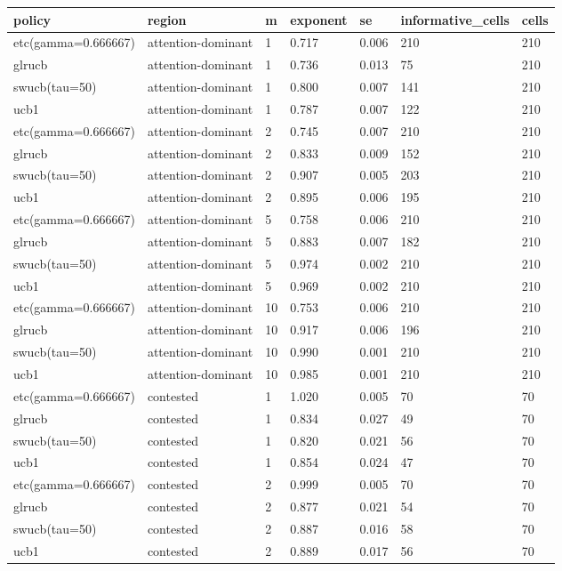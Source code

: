 \begin{tabular}{lllllll}
\toprule
policy & region & m & exponent & se & informative\_cells & cells \\
\midrule
etc(gamma=0.666667) & attention-dominant & 1 & 0.717 & 0.006 & 210 & 210 \\
glrucb & attention-dominant & 1 & 0.736 & 0.013 & 75 & 210 \\
swucb(tau=50) & attention-dominant & 1 & 0.800 & 0.007 & 141 & 210 \\
ucb1 & attention-dominant & 1 & 0.787 & 0.007 & 122 & 210 \\
etc(gamma=0.666667) & attention-dominant & 2 & 0.745 & 0.007 & 210 & 210 \\
glrucb & attention-dominant & 2 & 0.833 & 0.009 & 152 & 210 \\
swucb(tau=50) & attention-dominant & 2 & 0.907 & 0.005 & 203 & 210 \\
ucb1 & attention-dominant & 2 & 0.895 & 0.006 & 195 & 210 \\
etc(gamma=0.666667) & attention-dominant & 5 & 0.758 & 0.006 & 210 & 210 \\
glrucb & attention-dominant & 5 & 0.883 & 0.007 & 182 & 210 \\
swucb(tau=50) & attention-dominant & 5 & 0.974 & 0.002 & 210 & 210 \\
ucb1 & attention-dominant & 5 & 0.969 & 0.002 & 210 & 210 \\
etc(gamma=0.666667) & attention-dominant & 10 & 0.753 & 0.006 & 210 & 210 \\
glrucb & attention-dominant & 10 & 0.917 & 0.006 & 196 & 210 \\
swucb(tau=50) & attention-dominant & 10 & 0.990 & 0.001 & 210 & 210 \\
ucb1 & attention-dominant & 10 & 0.985 & 0.001 & 210 & 210 \\
etc(gamma=0.666667) & contested & 1 & 1.020 & 0.005 & 70 & 70 \\
glrucb & contested & 1 & 0.834 & 0.027 & 49 & 70 \\
swucb(tau=50) & contested & 1 & 0.820 & 0.021 & 56 & 70 \\
ucb1 & contested & 1 & 0.854 & 0.024 & 47 & 70 \\
etc(gamma=0.666667) & contested & 2 & 0.999 & 0.005 & 70 & 70 \\
glrucb & contested & 2 & 0.877 & 0.021 & 54 & 70 \\
swucb(tau=50) & contested & 2 & 0.887 & 0.016 & 58 & 70 \\
ucb1 & contested & 2 & 0.889 & 0.017 & 56 & 70 \\

\end{tabular}
